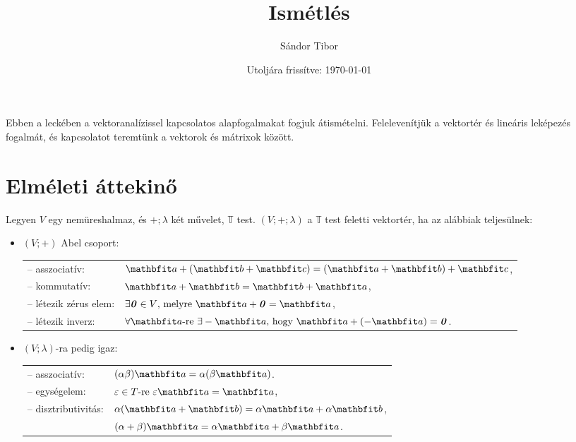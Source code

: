\documentclass[lang=magyar]{math-handout}
\title{Ismétlés}
\date{Utoljára frissítve: \today}
\author{Sándor Tibor}
\begin{document}
\allowdisplaybreaks

\maketitle

\vspace{1em}

\begin{summary}
  Ebben a leckében a vektoranalízissel kapcsolatos alapfogalmakat fogjuk
  átismételni. Felelevenítjük a vektortér és lineáris leképezés fogalmát,
  és kapcsolatot teremtünk a vektorok és mátrixok között.
\end{summary}

\vspace{-1em}

\section{Elméleti áttekinő}

\vspace{1em}

\begin{definition}[Vektortér]
  Legyen $V$ egy nemüreshalmaz, és $+; \lambda$ két művelet, $\mathbb T$ test.
  $(V; +; \lambda)$ a $\mathbb T$ test feletti vektortér, ha az alábbiak
  teljesülnek:
  \begin{itemize}
    \def\arraystretch{1.2}
    \item $(V; +)$ Abel csoport:\\[1mm]
          \begin{tabular}{p{45mm} l}
            -- asszociatív:        &
            $\rvec a + (\rvec b + \rvec c) = (\rvec a + \rvec b) + \rvec c$,
            \\
            -- kommutatív:         &
            $\rvec a + \rvec b = \rvec b + \rvec a$,
            \\
            -- létezik zérus elem: &
            $\exists \nvec \in V \text{, melyre } \rvec a + \nvec = \rvec a$,
            \\
            -- létezik inverz:     &
            $\forall \rvec a \text{-re } \exists - \rvec a \text{, hogy } \rvec a + (- \rvec a) = \nvec$.
          \end{tabular}
    \item $(V; \lambda)$-ra pedig igaz:\\[1mm]
          \begin{tabular}{p{45mm} l}
            -- asszociatív:      & $(\alpha \beta) \rvec a = \alpha (\beta \rvec a)$.
            \\
            -- egységelem:       & $\varepsilon \in T \text{-re } \varepsilon\rvec a = \rvec a$,
            \\
            -- disztributivitás: & $\alpha(\rvec a + \rvec b) = \alpha \rvec a + \alpha \rvec b$,
            \\
                                 & $(\alpha + \beta) \rvec a = \alpha \rvec a + \beta \rvec a$.
          \end{tabular}
  \end{itemize}
\end{definition}
\end{document}
